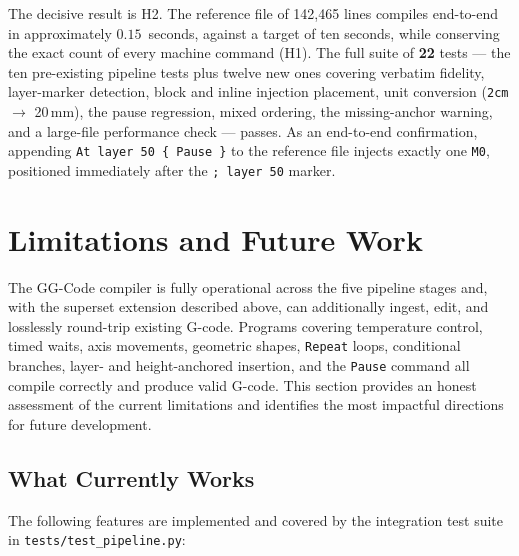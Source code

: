 The decisive result is H2. The reference file of 142{,}465 lines compiles end-to-end in approximately $0.15$~seconds, against a target of ten seconds, while conserving the exact count of every machine command (H1). The full suite of \textbf{22} tests --- the ten pre-existing pipeline tests plus twelve new ones covering verbatim fidelity, layer-marker detection, block and inline injection placement, unit conversion (\texttt{2cm} $\rightarrow$ 20\,mm), the pause regression, mixed ordering, the missing-anchor warning, and a large-file performance check --- passes. As an end-to-end confirmation, appending \texttt{At layer 50 \{ Pause \}} to the reference file injects exactly one \texttt{M0}, positioned immediately after the \texttt{; layer 50} marker.

\section{Limitations and Future Work}
\label{sec:limitations}

The GG-Code compiler is fully operational across the five pipeline stages and, with the superset extension described above, can additionally ingest, edit, and losslessly round-trip existing G-code. Programs covering temperature control, timed waits, axis movements, geometric shapes, \texttt{Repeat} loops, conditional branches, layer- and height-anchored insertion, and the \texttt{Pause} command all compile correctly and produce valid G-code. This section provides an honest assessment of the current limitations and identifies the most impactful directions for future development.

\subsection*{What Currently Works}

The following features are implemented and covered by the integration test suite in \texttt{tests/test\_pipeline.py}:

